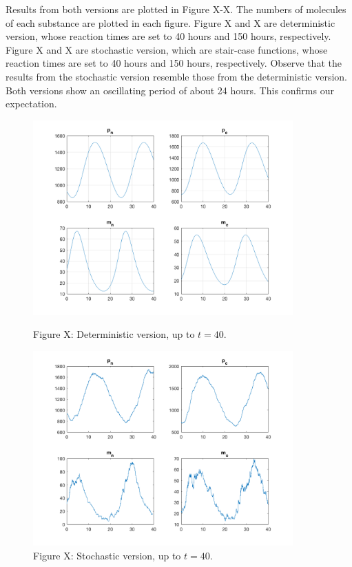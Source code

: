 \documentclass[12pt]{article}
\renewcommand{\(}{\left (}
\renewcommand{\)}{\right )}
\begin{document}
Results from both versions are plotted in Figure X-X. The numbers of molecules of each substance are plotted in each figure. Figure X and X are deterministic version, whose reaction times are set to 40 hours and 150 hours, respectively. Figure X and X are stochastic version, which are stair-case functions, whose reaction times are set to 40 hours and 150 hours, respectively. Observe that the results from the stochastic version resemble those from the deterministic version. Both versions show an oscillating period of about 24 hours. This confirms our expectation.
\begin{figure} [h]
    \centering
	\begin{minipage}{0.45\textwidth}
		\centering
		\includegraphics[width=0.89\textwidth]{single_oscillator_zoom_in.png}
		\caption*{\small Figure X: Deterministic version, up to $t=40.$}
	\end{minipage}
	\begin{minipage}{0.45\textwidth}
		\centering
		\includegraphics[width=0.89\textwidth]{sto_single_oscillator_zoom_in.png}
		\caption*{\small Figure X: Stochastic version, up to $t=40.$}
	\end{minipage}

\end{figure}
\end{document}

